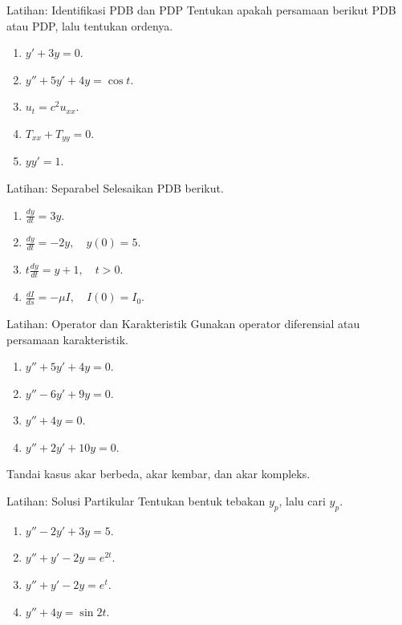 \documentclass[aspectratio=169,11pt]{beamer}
\begin{document}
\begin{frame}{Latihan: Identifikasi PDB dan PDP}
Tentukan apakah persamaan berikut PDB atau PDP, lalu tentukan ordenya.
\begin{enumerate}
  \item $y'+3y=0$.
  \item $y''+5y'+4y=\cos t$.
  \item $u_t=c^2u_{xx}$.
  \item $T_{xx}+T_{yy}=0$.
  \item $yy'=1$.
\end{enumerate}
\end{frame}

\begin{frame}{Latihan: Separabel}
Selesaikan PDB berikut.
\begin{enumerate}
  \item $\displaystyle \frac{dy}{dt}=3y$.
  \item $\displaystyle \frac{dy}{dt}=-2y,\quad y(0)=5$.
  \item $\displaystyle t\frac{dy}{dt}=y+1,\quad t>0$.
  \item $\displaystyle \frac{dI}{ds}=-\mu I,\quad I(0)=I_0$.
\end{enumerate}
\end{frame}

\begin{frame}{Latihan: Operator dan Karakteristik}
Gunakan operator diferensial atau persamaan karakteristik.
\begin{enumerate}
  \item $y''+5y'+4y=0$.
  \item $y''-6y'+9y=0$.
  \item $y''+4y=0$.
  \item $y''+2y'+10y=0$.
\end{enumerate}
Tandai kasus akar berbeda, akar kembar, dan akar kompleks.
\end{frame}

\begin{frame}{Latihan: Solusi Partikular}
Tentukan bentuk tebakan $y_p$, lalu cari $y_p$.
\begin{enumerate}
  \item $y''-2y'+3y=5$.
  \item $y''+y'-2y=e^{2t}$.
  \item $y''+y'-2y=e^t$.
  \item $y''+4y=\sin 2t$.
\end{enumerate}
\end{frame}
\end{document}
